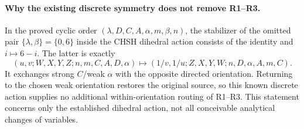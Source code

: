 \paragraph{Why the existing discrete symmetry does not remove R1--R3.}
In the proved cyclic order $(\lambda,D,C,A,\alpha,m,\beta,n)$,
the stabilizer of the omitted pair $\{\lambda,\beta\}=\{0,6\}$
inside the CHSH dihedral action consists of the identity and
$i\mapsto6-i$. The latter is exactly
\[
 (u,v;W,X,Y,Z;n,m,C,A,D,\alpha)
 \longmapsto(1/v,1/u;Z,X,Y,W;n,D,\alpha,A,m,C).
\]
It exchanges strong $C$/weak $\alpha$ with the opposite directed
orientation. Returning to the chosen weak orientation restores the
original source, so this known discrete action supplies no additional
within-orientation routing of R1--R3. This statement concerns only
the established dihedral action, not all conceivable analytical
changes of variables.
